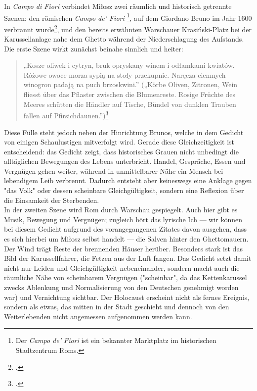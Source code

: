 \noindent In \textit{Campo di Fiori} verbindet Miłosz zwei räumlich und historisch getrennte Szenen: den römischen \textit{Campo de' Fiori} \footnote{Der \textit{Campo de' Fiori} ist ein bekannter Marktplatz im historischen Stadtzentrum Roms.}, auf dem Giordano Bruno im Jahr 1600 verbrannt wurde\footcite{fiori-1943}, und den bereits erwähnten Warschauer Krasiński-Platz bei der Karussellanlage nahe dem Ghetto während der Niederschlagung des Aufstands.
\\[6pt]
Die erste Szene wirkt zunächst beinahe sinnlich und heiter:
\begin{quote}
  „Kosze oliwek i cytryn, bruk opryskany winem i odłamkami kwiatów. Różowe owoce morza sypią na stoły przekupnie. Naręcza ciemnych winogron padają na puch brzoskwini.” („Körbe Oliven, Zitronen, Wein fliesst über das Pflaster zwischen die Blumenreste. Rosige Früchte des Meeres schütten die Händler auf Tische, Bündel von dunklen Trauben fallen auf Pfirsichdaunen.”)\footcite[Z. 2–8]{fiori-1943}
\end{quote}
Diese Fülle steht jedoch neben der Hinrichtung Brunos, welche in dem Gedicht von einigen Schaulustigen mitverfolgt wird. Gerade diese Gleichzeitigkeit ist entscheidend: das Gedicht zeigt, dass historisches Grauen nicht unbedingt die alltäglichen Bewegungen des Lebens unterbricht. Handel, Gespräche, Essen und Vergnügen gehen weiter, während in unmittelbarer Nähe ein Mensch bei lebendigem Leib verbrennt. Dadurch entsteht aber keineswegs eine Anklage gegen "das Volk" oder dessen scheinbare Gleichgültigkeit, sondern eine Reflexion über die Einsamkeit der Sterbenden.
\\[6pt]
In der zweiten Szene wird Rom durch Warschau gespiegelt. Auch hier gibt es Musik, Bewegung und Vergnügen; zugleich hört das lyrische Ich — wir können bei diesem Gedicht aufgrund des vorangegangenen Zitates davon ausgehen, dass es sich hierbei um Miłosz selbst handelt — die Salven hinter den Ghettomauern. Der Wind trägt Reste der brennenden Häuser herüber. Besonders stark ist das Bild der Karussellfahrer, die Fetzen aus der Luft fangen. Das Gedicht setzt damit nicht nur Leiden und Gleichgültigkeit nebeneinander, sondern macht auch die räumliche Nähe von scheinbarem Vergnügen ("scheinbar", da das Kettenkarussel zwecks Ablenkung und Normalisierung von den Deutschen genehmigt worden war) und Vernichtung sichtbar. Der Holocaust erscheint nicht als fernes Ereignis, sondern als etwas, das mitten in der Stadt geschieht und dennoch von den Weiterlebenden nicht angemessen aufgenommen werden kann.
\\[6pt]
